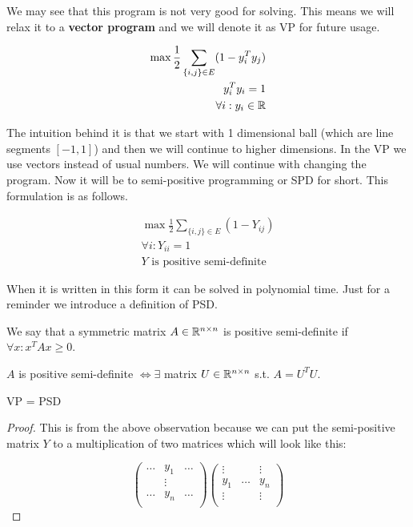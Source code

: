 We may see that this program is not very good for solving. This means we will relax it to a \textbf{vector program} and we will denote it as VP for future usage.

$$
\begin{aligned}
	\max \frac{1}{2} \sum_{\{i,j\} \in E} (1 - y_i^T y_j) \\
	y_i^T y_i = 1 \\ 
	\forall i : y_{i} \in \mathbb{R}
\end{aligned}
$$

The intuition behind it is that we start with 1 dimensional ball (which are line segments $[-1,1]$) and then we will continue to higher dimensions. In the VP we use vectors instead of usual numbers. We will continue with changing the program. Now it will be to semi-positive programming or SPD for short. This formulation is as follows.

$$
\begin{aligned}
	\max \frac{1}{2} \sum_{\{i,j\} \in E} (1 - Y_{ij}) \\
	\forall i : Y_{ii} = 1 \\
	Y \text{ is positive semi-definite}
\end{aligned}
$$

When it is written in this form it can be solved in polynomial time. Just for a reminder we introduce a definition of PSD.

\begin{defn}
	We say that a symmetric matrix $A \in \mathbb{R}^{n \times n}$ is positive semi-definite if $\forall x : x^T A x \geq 0$.
\end{defn}

\begin{observ}
	$A$ is positive semi-definite $\Leftrightarrow \exists$ matrix $U \in \mathbb{R}^{n \times n}$ s.t. $A = U^T U$. 
\end{observ}

\begin{observ}
	VP = PSD
\end{observ}

\begin{proof}
	This is from the above observation because we can put the semi-positive matrix $Y$ to a multiplication of two matrices which will look like this:
	
	$$
	\begin{pmatrix}
		\dots & y_1 & \dots \\
		& \vdots & \\
		\dots & y_n & \dots \\
	\end{pmatrix}
	\begin{pmatrix}
		\vdots &  & \vdots \\
		y_1 & \dots & y_n\\
		\vdots &  & \vdots \\
	\end{pmatrix}
	$$
\end{proof}

